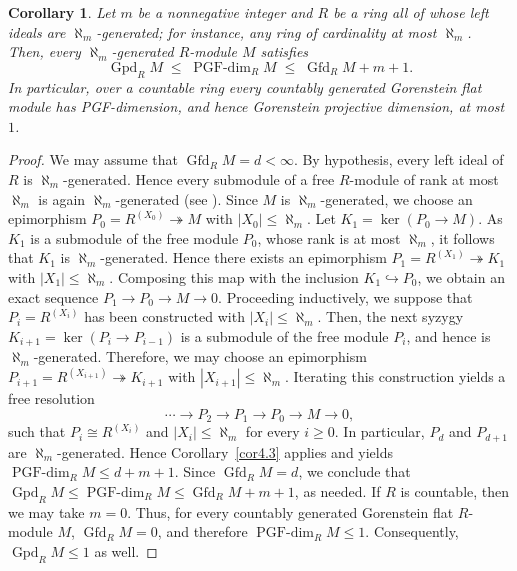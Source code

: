 \documentclass[12pt]{amsart}
\newtheorem{corollary}[theorem]{Corollary}
\theoremstyle{remark}
\theoremstyle{definition}
\theoremstyle{plain}
\DeclareMathOperator{\Gfd}{Gfd}
\DeclareMathOperator{\Gpd}{Gpd}
\newcommand{\PGFdim}{\operatorname{PGF\text{-}dim}}
\newcommand{\alephm}{\aleph_m}
\begin{document}
\begin{corollary}\label{cor4.4}
Let $m$ be a nonnegative integer and $R$ be a ring all of whose left ideals are $\alephm$-generated; for instance, any ring of cardinality at most $\alephm$. Then, every $\alephm$-generated $R$-module $M$ satisfies
\[
\Gpd_RM\;\le\;\PGFdim_RM\;\le\;\Gfd_RM+m+1 .
\]
In particular, over a countable ring every countably generated Gorenstein flat module has PGF-dimension, and hence Gorenstein projective dimension, at most $1$.
\end{corollary}

\begin{proof} We may assume that $\Gfd_R M=d<\infty$. By hypothesis, every left ideal of $R$ is $\aleph_m$-generated. Hence every submodule of a free $R$-module of rank at most
$\aleph_m$ is again $\aleph_m$-generated (see \cite[Lemma~2.46]{Oso}). %
Since $M$ is $\aleph_m$-generated, we choose an epimorphism $P_0=R^{(X_0)}\twoheadrightarrow M$ with $|X_0|\leq\aleph_m$. Let $K_1=\ker(P_0\to M)$. As $K_1$ is a submodule of the free module $P_0$, whose rank is at most $\aleph_m$, it follows that $K_1$ is $\aleph_m$-generated.
Hence there exists an epimorphism
$P_1=R^{(X_1)}\twoheadrightarrow K_1$
with $|X_1|\leq\aleph_m$.
Composing this map with the inclusion $K_1\hookrightarrow P_0$, we
obtain an exact sequence $P_1\rightarrow P_0\rightarrow M\rightarrow 0$. Proceeding inductively, we suppose that
$P_i=R^{(X_i)}$ has been constructed with $|X_i|\leq\aleph_m$.
Then, the next syzygy $K_{i+1}=\ker(P_i\to P_{i-1})$
is a submodule of the free module $P_i$, and hence is
$\aleph_m$-generated. Therefore, we may choose an epimorphism
$P_{i+1}=R^{(X_{i+1})}\twoheadrightarrow K_{i+1}$ with $|X_{i+1}|\leq\aleph_m$.
Iterating this construction yields a free resolution
$$\cdots\rightarrow P_2\rightarrow P_1
\rightarrow P_0\rightarrow M\rightarrow 0,
$$
such that $P_i\cong R^{(X_i)}$ and $|X_i|\leq\aleph_m$ for every $i\geq 0$. In particular, $P_d$ and $P_{d+1}$ are
$\aleph_m$-generated. Hence Corollary~\ref{cor4.3} applies and yields $\PGFdim_R M\leq d+m+1$.
Since $\Gfd_R M=d$,
we conclude that $\Gpd_R M \leq\PGFdim_R M\leq\Gfd_R M+m+1$, as needed. If $R$ is countable, then we may take $m=0$. Thus, for every
countably generated Gorenstein flat $R$-module $M$, $\Gfd_R M=0$, and therefore $\PGFdim_R M\leq 1$. Consequently, $\Gpd_R M\leq 1$ as well.
\end{proof}
\end{document}
